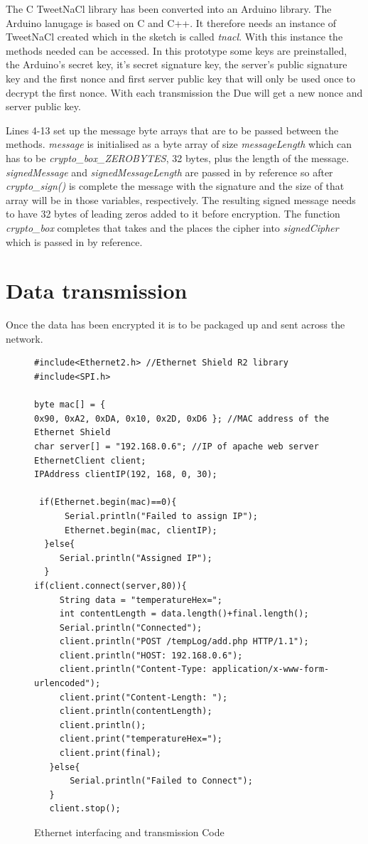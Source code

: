 The C TweetNaCl library has been converted into an Arduino library. The Arduino lanugage is based on C and C++. It therefore needs an instance of TweetNaCl created which in the sketch is called \emph{tnacl}. With this instance the methods needed can be accessed. In this prototype some keys are preinstalled, the Arduino's secret key, it's secret signature key, the server's public signature key and the first nonce and first server public key that will only be used once to decrypt the first nonce. With each transmission the Due will get a new nonce and server public key. 

Lines 4-13 set up the message byte arrays that are to be passed between the methods. \emph{message} is initialised as a byte array of size \emph{messageLength} which can has to be \emph{crypto\_box\_ZEROBYTES}, 32 bytes, plus the length of the message. \emph{signedMessage} and \emph{signedMessageLength} are passed in by reference so after \emph{crypto\_sign()} is complete the message with the signature and the size of that array will be in those variables, respectively. The resulting signed message needs to have 32 bytes of leading zeros added to it before encryption. The function \emph{crypto\_box} completes that takes and the places the cipher into \emph{signedCipher} which is passed in by reference. 

\clearpage

\section{Data transmission}
Once the data has been encrypted it is to be packaged up and sent across the network.

\begin{figure}[H]
\begin{lstlisting}[style=Arduino]
#include<Ethernet2.h> //Ethernet Shield R2 library
#include<SPI.h>

byte mac[] = {
0x90, 0xA2, 0xDA, 0x10, 0x2D, 0xD6 }; //MAC address of the Ethernet Shield
char server[] = "192.168.0.6"; //IP of apache web server
EthernetClient client;
IPAddress clientIP(192, 168, 0, 30);

 if(Ethernet.begin(mac)==0){
      Serial.println("Failed to assign IP");
      Ethernet.begin(mac, clientIP);
  }else{
     Serial.println("Assigned IP");
  }
if(client.connect(server,80)){
     String data = "temperatureHex=";
     int contentLength = data.length()+final.length();
     Serial.println("Connected");   
     client.println("POST /tempLog/add.php HTTP/1.1"); 
     client.println("HOST: 192.168.0.6"); 
     client.println("Content-Type: application/x-www-form-urlencoded");
     client.print("Content-Length: ");
     client.println(contentLength);
     client.println();
     client.print("temperatureHex=");
     client.print(final);
   }else{
       Serial.println("Failed to Connect");
   }
   client.stop();
\end{lstlisting}
\caption{Ethernet interfacing and transmission Code }
\label{snip:ethernet}
\end{figure}

